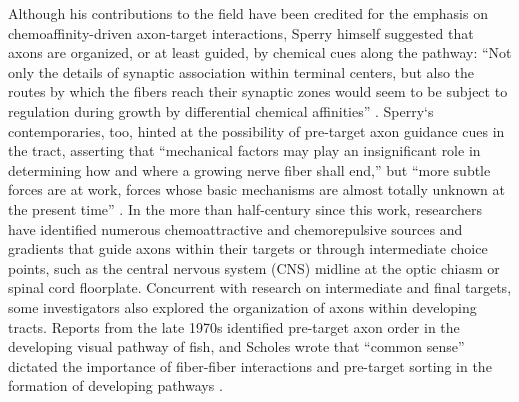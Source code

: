 Although his contributions to the field have been credited for the emphasis on chemoaffinity-driven axon-target interactions, Sperry himself suggested that axons are organized, or at least guided, by chemical cues along the pathway: ``Not only the details of synaptic association within terminal centers, but also the routes by which the fibers reach their synaptic zones would seem to be subject to regulation during growth by differential chemical affinities'' \cite{attardi1963preferential}.
Sperry`s contemporaries, too, hinted at the possibility of pre-target axon guidance cues in the tract, asserting that ``mechanical factors may play an insignificant role in determining how and where a growing nerve fiber shall end,'' but ``more subtle forces are at work, forces whose basic mechanisms are almost totally unknown at the present time'' \cite{barnard1956study}.
In the more than half-century since this work, researchers have identified numerous chemoattractive and chemorepulsive sources and gradients that guide axons within their targets or through intermediate choice points, such as the central nervous system (CNS) midline at the optic chiasm or spinal cord floorplate.
Concurrent with research on intermediate and final targets, some investigators also explored the organization of axons within developing tracts.
Reports from the late 1970s identified pre-target axon order in the developing visual pathway of fish, and Scholes wrote that ``common sense'' dictated the importance of fiber-fiber interactions and pre-target sorting in the formation of developing pathways \cite{cook1977multiple,scholes1979nerve}.